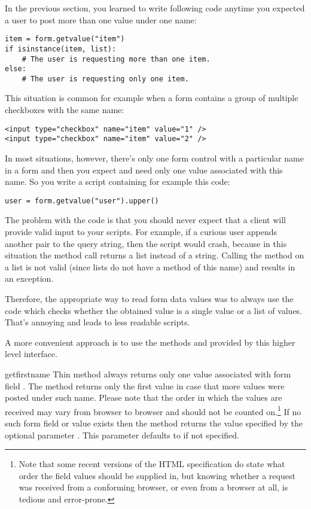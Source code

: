 In the previous section, you learned to write following code anytime
you expected a user to post more than one value under one name:

\begin{verbatim}
item = form.getvalue("item")
if isinstance(item, list):
    # The user is requesting more than one item.
else:
    # The user is requesting only one item.
\end{verbatim}

This situation is common for example when a form contains a group of
multiple checkboxes with the same name:

\begin{verbatim}
<input type="checkbox" name="item" value="1" />
<input type="checkbox" name="item" value="2" />
\end{verbatim}

In most situations, however, there's only one form control with a
particular name in a form and then you expect and need only one value
associated with this name.  So you write a script containing for
example this code:

\begin{verbatim}
user = form.getvalue("user").upper()
\end{verbatim}

The problem with the code is that you should never expect that a
client will provide valid input to your scripts.  For example, if a
curious user appends another  pair to the query string,
then the script would crash, because in this situation the
 method call returns a list instead of a
string.  Calling the  method on a list is not valid
(since lists do not have a method of this name) and results in an
 exception.

Therefore, the appropriate way to read form data values was to always
use the code which checks whether the obtained value is a single value
or a list of values.  That's annoying and leads to less readable
scripts.

A more convenient approach is to use the methods 
and  provided by this higher level interface.

\begin{methoddesc}[FieldStorage]{getfirst}{name}
  Thin method always returns only one value associated with form field
  .  The method returns only the first value in case that
  more values were posted under such name.  Please note that the order
  in which the values are received may vary from browser to browser
  and should not be counted on.\footnote{Note that some recent
      versions of the HTML specification do state what order the
      field values should be supplied in, but knowing whether a
      request was received from a conforming browser, or even from a
      browser at all, is tedious and error-prone.}  If no such form
  field or value exists then the method returns the value specified by
  the optional parameter .  This parameter defaults to
   if not specified.
\end{methoddesc}

